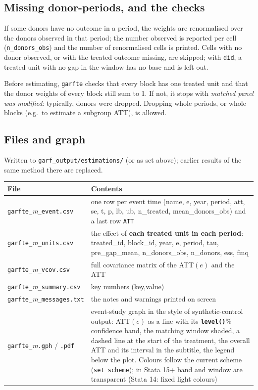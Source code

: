 \documentclass[11pt,a4paper]{article}
\newcommand{\opt}[1]{\texttt{\textbf{#1}}}
\newcommand{\code}[1]{\texttt{#1}}
\begin{document}
\subsection{Missing donor-periods, and the checks}
If some donors have no outcome in a period, the weights are renormalised over the donors observed
in that period; the number observed is reported per cell (\code{n\_donors\_obs}) and the number of
renormalised cells is printed. Cells with no donor observed, or with the treated outcome missing,
are skipped; with \code{did}, a treated unit with no gap in the window has no base and is left out.

Before estimating, \code{garfte} checks that every block has one treated unit and that the donor
weights of every block still sum to 1. If not, it stops with \emph{matched panel was modified}:
typically, donors were dropped. Dropping whole periods, or whole blocks (e.g.\ to estimate a
subgroup ATT), is allowed.

\subsection{Files and graph}
Written to \code{garf\_output/estimations/} (or as set above); earlier results of the same method
there are replaced.

\begin{tabularx}{\textwidth}{@{}lX@{}}
\toprule
File & Contents\\
\midrule
\code{garfte\_}\emph{m}\code{\_event.csv} & one row per event time (name, e, year, period, att, se, t, p, lb, ub, n\_treated, mean\_donors\_obs) and a last row \code{ATT}\\
\code{garfte\_}\emph{m}\code{\_units.csv} & the effect of \textbf{each treated unit in each period}: treated\_id, block\_id, year, e, period, tau, pre\_gap\_mean, n\_donors\_obs, n\_donors, ess, fmq\\
\code{garfte\_}\emph{m}\code{\_vcov.csv} & full covariance matrix of the ATT$(e)$ and the ATT\\
\code{garfte\_}\emph{m}\code{\_summary.csv} & key numbers (key,value)\\
\code{garfte\_}\emph{m}\code{\_messages.txt} & the notes and warnings printed on screen\\
\code{garfte\_}\emph{m}\code{.gph} / \code{.pdf} & event-study graph in the style of synthetic-control output: ATT$(e)$ as a line with its \opt{level()}\% confidence band, the matching window shaded, a dashed line at the start of the treatment, the overall ATT and its interval in the subtitle, the legend below the plot. Colours follow the current scheme (\code{set scheme}); in Stata 15+ band and window are transparent (Stata 14: fixed light colours)\\
\bottomrule
\end{tabularx}
\end{document}
